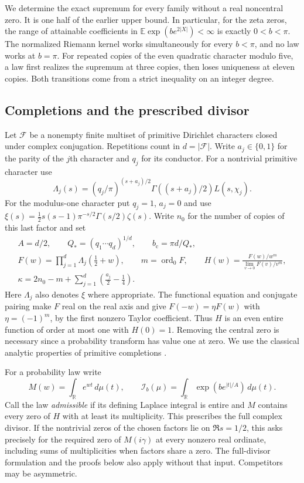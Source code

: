 \documentclass[11pt,letterpaper]{article}
\newcommand{\R}{\mathbb R}\newcommand{\C}{\mathbb C}\newcommand{\E}{\mathbb E}
\newcommand{\dd}{\,d}\newcommand{\ord}{\operatorname{ord}}
\newcommand{\calF}{\mathcal F}\newcommand{\calI}{\mathcal I}
\newcommand{\bcrit}{b_{\mathrm c}}
\begin{document}
We determine the exact supremum for every family without a real noncentral zero. It is one half of the earlier upper bound. In particular, for the zeta zeros, the range of attainable coefficients in $\E\exp(b e^{2|X|})<\infty$ is exactly $0<b<\pi$. The normalized Riemann kernel works simultaneously for every $b<\pi$, and no law works at $b=\pi$. For repeated copies of the even quadratic character modulo five, a law first realizes the supremum at three copies, then loses uniqueness at eleven copies. Both transitions come from a strict inequality on an integer degree.

\subsection{Completions and the prescribed divisor}
Let $\calF$ be a nonempty finite multiset of primitive Dirichlet characters closed under complex conjugation. Repetitions count in $d=|\calF|$. Write $a_j\in\{0,1\}$ for the parity of the $j$th character and $q_j$ for its conductor. For a nontrivial primitive character use
\[
 \Lambda_j(s)=(q_j/\pi)^{(s+a_j)/2}\Gamma((s+a_j)/2)L(s,\chi_j).
\]
For the modulus-one character put $q_j=1$, $a_j=0$ and use
$\xi(s)=\tfrac12s(s-1)\pi^{-s/2}\Gamma(s/2)\zeta(s)$.
Write $n_0$ for the number of copies of this last factor and set
\begin{gather}
 A=d/2,\qquad Q_*=(q_1\cdots q_d)^{1/d},\qquad \bcrit=\pi d/Q_*,
 \label{eq:constants}\\
 F(w)=\prod_{j=1}^d\Lambda_j(\tfrac12+w),\qquad m=\ord_0 F,\qquad
 H(w)=\frac{F(w)/w^m}{\lim_{v\to0}F(v)/v^m},\label{eq:H}\\
 \kappa=2n_0-m+\sum_{j=1}^d\left(\frac{a_j}{2}-\frac14\right).
 \label{eq:kappa}
\end{gather}
Here $\Lambda_j$ also denotes $\xi$ where appropriate. The functional equation and conjugate pairing make $F$ real on the real axis and give $F(-w)=\eta F(w)$ with $\eta=(-1)^m$, by the first nonzero Taylor coefficient. Thus $H$ is an even entire function of order at most one with $H(0)=1$. Removing the central zero is necessary since a probability transform has value one at zero. We use the classical analytic properties of primitive completions \cite{dirichlet,davenport}.

For a probability law write
\[
 M(w)=\int_{\R}e^{wt}\dd\mu(t),\qquad
 \calI_b(\mu)=\int_{\R}\exp\!\left(b e^{|t|/A}\right)\dd\mu(t).
\]
Call the law \emph{admissible} if its defining Laplace integral is entire and $M$ contains every zero of $H$ with at least its multiplicity. This prescribes the full complex divisor. If the nontrivial zeros of the chosen factors lie on $\Re s=1/2$, this asks precisely for the required zero of $M(i\gamma)$ at every nonzero real ordinate, including sums of multiplicities when factors share a zero. The full-divisor formulation and the proofs below also apply without that input. Competitors may be asymmetric.
\end{document}
